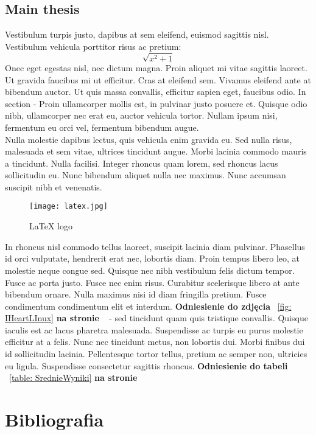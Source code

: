 \documentclass[12pt,a4paper]{article}
\begin{document}
	
	\subsection{Main thesis}
	Vestibulum turpis justo, dapibus at sem eleifend, euismod sagittis nisl. Vestibulum vehicula porttitor risus ac pretium:
	\[\sqrt{x^2+1}\] 
	Onec eget egestas nisl, nec dictum magna. Proin aliquet mi vitae sagittis laoreet. Ut gravida faucibus mi ut efficitur.\cite{B1} Cras at eleifend sem. Vivamus eleifend ante at bibendum auctor. Ut quis massa convallis, efficitur sapien eget, faucibus odio.
	In section  - Proin ullamcorper mollis est, in pulvinar justo posuere et. Quisque odio nibh, ullamcorper nec erat eu, auctor vehicula tortor. Nullam ipsum nisi, fermentum eu orci vel, fermentum bibendum augue.
	\\Nulla molestie dapibus lectus, quis vehicula enim gravida eu. Sed nulla risus, malesuada et sem vitae, ultrices tincidunt augue. Morbi lacinia commodo mauris a tincidunt. Nulla facilisi. Integer rhoncus quam lorem, sed rhoncus lacus sollicitudin eu. Nunc bibendum aliquet nulla nec maximus. Nunc accumsan suscipit nibh et venenatis. 
	\begin{figure}[H]
		\centering
		\texttt{[image: latex.jpg]}
		\caption{LaTeX logo}
		\label{fig: LaTeXlogo}
	\end{figure}

	In rhoncus nisl commodo tellus laoreet\cite{A1}, suscipit lacinia diam pulvinar. Phasellus id orci vulputate, hendrerit erat nec, lobortis diam. Proin tempus libero leo, at molestie neque congue sed. Quisque nec nibh vestibulum felis dictum tempor.\cite{C5} Fusce ac porta justo. Fusce nec enim risus. Curabitur\cite{Un1} scelerisque libero at ante bibendum ornare. Nulla maximus nisi id diam fringilla pretium. Fusce condimentum condimentum elit et interdum. \textbf{Odniesienie do zdjęcia} ~\ref{fig: IHeartLInux} \textbf{na stronie} ~\pageref{fig: IHeartLInux} - sed tincidunt quam quis tristique convallis.
	Quisque iaculis est ac lacus pharetra malesuada. Suspendisse ac turpis eu purus molestie efficitur at a felis.\cite{M1} Nunc nec tincidunt metus, non lobortis dui. Morbi finibus dui id sollicitudin lacinia. Pellentesque tortor tellus, pretium ac semper non, ultricies eu ligula. Suspendisse consectetur sagittis rhoncus. \textbf{Odniesienie do tabeli} ~\ref{table: SrednieWyniki} \textbf{na stronie} ~\pageref{table: SrednieWyniki}
	
	\newpage
	\section{Bibliografia}
	\printbibliography
	
\end{document}
